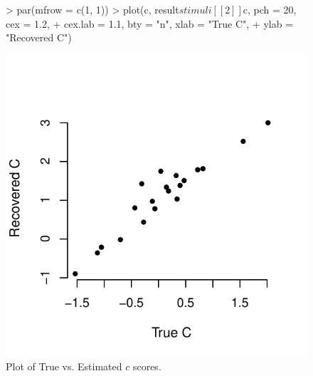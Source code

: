 \documentclass[nojss]{jss}
\begin{document}
\begin{figure}
\begin{center}
\begin{Schunk}
\begin{Sinput}
> par(mfrow = c(1, 1))
> plot(c, result$stimuli[[2]]$c, pch = 20, cex = 1.2, 
+     cex.lab = 1.1, bty = "n", xlab = "True C", 
+     ylab = "Recovered C")
\end{Sinput}
\end{Schunk}
\includegraphics{basicspace-eight}
\end{center}
\caption{Plot of True vs. Estimated $c$ scores.}
\label{fig:eight}
\end{figure}
\end{document}
